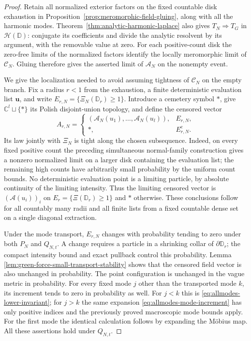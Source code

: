 \documentclass[11pt,a4paper]{article}
\numberwithin{equation}{section}
\theoremstyle{definition}
\theoremstyle{remark}
\newcommand{\D}{\mathbb D}
\newcommand{\C}{\mathbb C}
\begin{document}
\begin{proof}
Retain all normalized exterior factors on the fixed countable disk
exhaustion in Proposition~\ref{prop:meromorphic-field-gluing}, along
with all the harmonic modes. Theorem~\ref{thm:analytic-harmonic-laplace}
also gives $T_N\Rightarrow T_G$ in $\mathcal H(\D)$: conjugate its
coefficients and divide the analytic resolvent by its argument,
with the removable value at zero. For each positive-count disk the
zero-free limits of the normalized factors identify the locally
meromorphic limit of $\mathcal C_N$. Gluing therefore gives the
asserted limit of $\mathcal A_N$ on the nonempty event.

We give the localization needed to avoid assuming tightness of
$\mathcal C_N$ on the empty branch. Fix a radius $r<1$ from the
exhaustion, a finite deterministic evaluation list $\mathbf u$, and
write $E_{r,N}=\{\Xi_N(\D_r)\ge1\}$.
Introduce a cemetery symbol $*$, give $\C^l\sqcup\{*\}$ its Polish
disjoint-union topology, and define the censored vector
\[
 A_{r,N}=\begin{cases}
 (\mathcal A_N(u_1),\ldots,\mathcal A_N(u_l)),&E_{r,N},\\
 *,&E_{r,N}^{\mathrm c}.
 \end{cases}
\]
Its law jointly with $\Xi_N$ is tight along the chosen subsequence.
Indeed, on every fixed positive count the preceding simultaneous
normal-family construction gives a nonzero normalized limit on a
larger disk containing the evaluation list; the remaining high counts
have arbitrarily small probability by the uniform count bounds.
No deterministic evaluation point is a limiting particle, by absolute
continuity of the limiting intensity. Thus the limiting censored
vector is $(\mathcal A(u_i))_i$ on $E_r=\{\Xi(\D_r)\ge1\}$ and
$*$ otherwise. These conclusions follow for all countably many
radii and all finite lists from a fixed countable dense set on a
single diagonal extraction.

Under the mode transport, $E_{r,N}$ changes with probability tending
to zero under both $P_N$ and $Q_{N,t}$. A change requires a particle
in a shrinking collar of $\partial\D_r$; the compact intensity bound
and exact pullback control this probability. Lemma
\ref{lem:green-force-small-transport-stability} shows that the
censored field vector is also unchanged in probability. The point
configuration is unchanged in the vague metric in probability.
For every fixed mode $j$ other than the transported mode $k$, its
increment tends to zero in probability as well. For $j<k$ this is
\eqref{eq:allmodes-lower-invariant}; for $j>k$ the same expansion
\eqref{eq:allmodes-mode-increment} has only positive indices and
the previously proved macroscopic mode bounds apply. For the first
mode the identical calculation follows by expanding the M\"obius
map. All these assertions hold under $Q_{N,t}$.


\end{proof}
\end{document}
